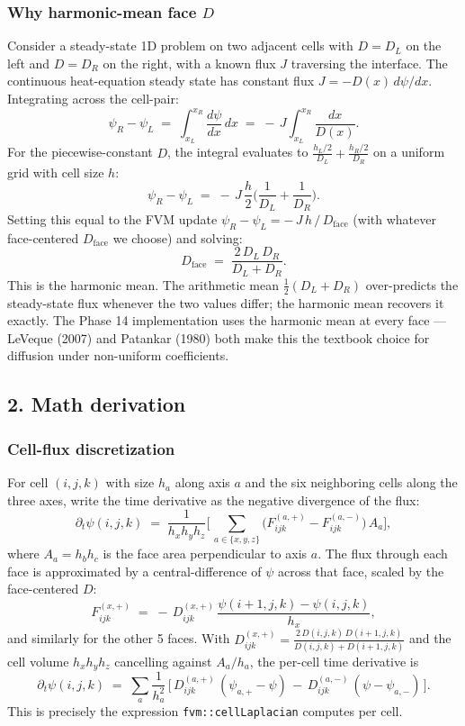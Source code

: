 \subsubsection{Why harmonic-mean face
\(D\)}\label{phase14-harmonic}

Consider a steady-state 1D problem on two adjacent cells with
\(D = D_L\) on the left and \(D = D_R\) on the right, with a known
flux \(J\) traversing the interface. The continuous
heat-equation steady state has constant flux
\(J = -D(x)\,d\psi/dx\). Integrating across the cell-pair:
\[
\psi_R - \psi_L \;=\; \int_{x_L}^{x_R} \frac{d\psi}{dx}\,dx \;=\; -\,J\!\int_{x_L}^{x_R}\!\frac{dx}{D(x)}.
\]
For the piecewise-constant \(D\), the integral evaluates to
\(\frac{h_L/2}{D_L} + \frac{h_R/2}{D_R}\) on a uniform grid with
cell size \(h\):
\[
\psi_R - \psi_L \;=\; -\,J\,\frac{h}{2}\Big(\frac{1}{D_L} + \frac{1}{D_R}\Big).
\]
Setting this equal to the FVM update \(\psi_R - \psi_L = -\,J\,h\,/\,D_{\text{face}}\)
(with whatever face-centered \(D_{\text{face}}\) we choose) and
solving:
\[
D_{\text{face}} \;=\; \frac{2\,D_L\,D_R}{D_L + D_R}.
\]
This is the harmonic mean. The arithmetic mean
\(\tfrac12(D_L + D_R)\) over-predicts the steady-state flux
whenever the two values differ; the harmonic mean recovers it
exactly. The Phase 14 implementation uses the harmonic mean at
every face --- LeVeque (2007) and Patankar (1980) both make this
the textbook choice for diffusion under non-uniform
coefficients.

\subsection{2. Math derivation}\label{phase14-math}

\subsubsection{Cell-flux discretization}\label{phase14-cell-flux}

For cell \((i, j, k)\) with size \(h_a\) along axis \(a\) and the
six neighboring cells along the three axes, write the time
derivative as the negative divergence of the flux:
\[
\partial_t\psi(i, j, k) \;=\; \frac{1}{h_x h_y h_z}\bigg[\,\sum_{a \in \{x, y, z\}}\!\big(F^{(a,+)}_{ijk} - F^{(a,-)}_{ijk}\big)\,A_a\bigg],
\]
where \(A_a = h_b h_c\) is the face area perpendicular to axis
\(a\). The flux through each face is approximated by a
central-difference of \(\psi\) across that face, scaled by the
face-centered \(D\):
\[
F^{(x,+)}_{ijk} \;=\; -\,D^{(x,+)}_{ijk}\,\frac{\psi(i+1, j, k) - \psi(i, j, k)}{h_x},
\]
and similarly for the other 5 faces. With
\(D^{(x,+)}_{ijk} = \tfrac{2\,D(i,j,k)\,D(i+1,j,k)}{D(i,j,k) + D(i+1,j,k)}\)
and the cell volume \(h_x h_y h_z\) cancelling against \(A_a / h_a\),
the per-cell time derivative is
\[
\partial_t\psi(i,j,k) \;=\; \sum_a \frac{1}{h_a^2}\,\Big[\,D^{(a,+)}_{ijk}\,(\psi_{a,+} - \psi)\,-\,D^{(a,-)}_{ijk}\,(\psi - \psi_{a,-})\,\Big].
\]
This is precisely the expression
\passthrough{\lstinline!fvm::cellLaplacian!} computes per cell.

